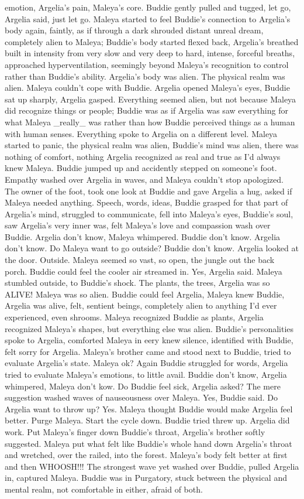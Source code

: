 \documentclass[12pt]{book}
\begin{document}
emotion, Argelia's pain, Maleya's core. Buddie gently pulled and tugged, let go, Argelia said, just let go. Maleya started to feel Buddie's connection to Argelia's body again, faintly, as if through a dark shrouded distant unreal dream, completely alien to Maleya; Buddie's body started flexed back, Argelia's breathed built in intensity from very slow and very deep to hard, intense, forceful breaths, approached hyperventilation, seemingly beyond Maleya's recognition to control rather than Buddie's ability. Argelia's body was alien. The physical realm was alien. Maleya couldn't cope with Buddie. Argelia opened Maleya's eyes, Buddie sat up sharply, Argelia gasped. Everything seemed alien, but not because Maleya did recognize things or people; Buddie was as if Argelia was saw everything for what Maleya \_really\_ was rather than how Buddie perceived things as a human with human senses. Everything spoke to Argelia on a different level. Maleya started to panic, the physical realm was alien, Buddie's mind was alien, there was nothing of comfort, nothing Argelia recognized as real and true as I'd always knew Maleya. Buddie jumped up and accidently stepped on someone's foot. Empathy washed over Argelia in waves, and Maleya couldn't stop apologized. The owner of the foot, took one look at Buddie and gave Argelia a hug, asked if Maleya needed anything. Speech, words, ideas, Buddie grasped for that part of Argelia's mind, struggled to communicate, fell into Maleya's eyes, Buddie's soul, saw Argelia's very inner was, felt Maleya's love and compassion wash over Buddie. Argelia don't know, Maleya whimpered. Buddie don't know. Argelia don't know. Do Maleya want to go outside? Buddie don't know. Argelia looked at the door. Outside. Maleya seemed so vast, so open, the jungle out the back porch. Buddie could feel the cooler air streamed in. Yes, Argelia said. Maleya stumbled outside, to Buddie's shock. The plants, the trees, Argelia was so ALIVE! Maleya was so alien. Buddie could feel Argelia, Maleya knew Buddie, Argelia was alive, felt, sentient beings, completely alien to anything I'd ever experienced, even shrooms. Maleya recognized Buddie as plants, Argelia recognized Maleya's shapes, but everything else was alien. Buddie's personalities spoke to Argelia, comforted Maleya in eery knew silence, identified with Buddie, felt sorry for Argelia. Maleya's brother came and stood next to Buddie, tried to evaluate Argelia's state. Maleya ok? Again Buddie struggled for words, Argelia tried to evaluate Maleya's emotions, to little avail. Buddie don't know, Argelia whimpered, Maleya don't kow. Do Buddie feel sick, Argelia asked? The mere suggestion washed waves of nauseousness over Maleya. Yes, Buddie said. Do Argelia want to throw up? Yes. Maleya thought Buddie would make Argelia feel better. Purge Maleya. Start the cycle down. Buddie tried threw up. Argelia did work. Put Maleya's finger down Buddie's throat, Argelia's brother softly suggested. Maleya put what felt like Buddie's whole hand down Argelia's throat and wretched, over the railed, into the forest. Maleya's body felt better at first and then WHOOSH!!! The strongest wave yet washed over Buddie, pulled Argelia in, captured Maleya. Buddie was in Purgatory, stuck between the physical and mental realm, not comfortable in either, afraid of both. 
\end{document}

